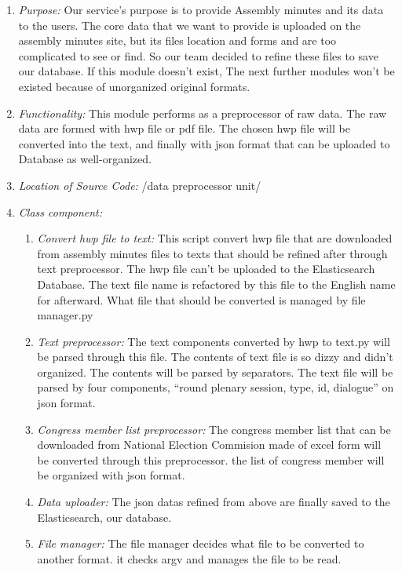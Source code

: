 \documentclass[conference]{IEEEtran}
\begin{document}
\vspace{30mm}
\begin{enumerate} 
  \item \textit{Purpose: } Our service’s purpose is to  provide Assembly minutes and its data to the users. The core data that we want to provide is uploaded on the assembly minutes site, but its files location and forms and are too complicated to see or find. So our team decided to refine these files to save our database. If this module doesn’t exist, The next further modules won’t be existed because of unorganized original formats.\\
  
  \item \textit{Functionality: } This module performs as a preprocessor of raw data. The raw data are formed with hwp file or pdf file. The chosen hwp file will be converted into the text, and finally with json format that can be uploaded to Database as well-organized.\

  \item \textit{Location of Source Code: } /data preprocessor unit/\\

  \item \textit{Class component: } 
  	 \begin{enumerate}
	\item \textit {Convert hwp file to text: }  This script convert hwp file that are downloaded from assembly minutes files to texts that should be refined after through text preprocessor. The hwp file can’t be uploaded to the Elasticsearch Database. The text file name is refactored by this file to the English name for afterward. What file that should be converted is managed by file manager.py\

	\item \textit {Text preprocessor: }  The text components converted by hwp to text.py will be parsed through this file. The contents of text file is so dizzy and didn’t organized. The contents will be parsed by  separators. The text file will be parsed by four components, “round plenary session, type, id, dialogue” on json format.\
	
	\item \textit {Congress member list preprocessor: }  The congress member list that can be downloaded from National Election Commision made of excel form will be converted through this preprocessor. the list of congress member will be organized with json format.\
	
	\item \textit {Data uploader: }  The json datas refined from above are finally saved to the Elasticsearch, our database.\
	\item \textit {File manager: }  The file manager decides what file to be converted to another format. it checks argv and manages the file to be read.\
	 

\end{enumerate}
\end{enumerate}
\end{document}
